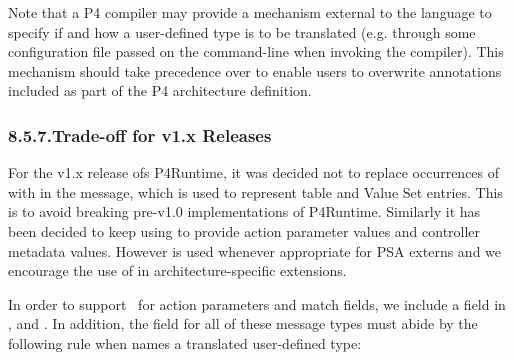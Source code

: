 \documentclass[11pt]{article}
\begin{document}
{%
\noindent{}Note that a P4 compiler may provide a mechanism external to the language to
specify if and how a user-defined type is to be translated (e.g. through some
configuration file passed on the command-line when invoking the compiler). This
mechanism should take precedence over  to enable users
to overwrite annotations included as part of the P4 architecture definition.%

\subsubsection{8.5.7.\hspace*{0.5em}Trade-off for v1.x Releases}\label{sec-trade-off-for-v1x-releases}%

\noindent{}For the v1.x release ofs P4Runtime, it was decided not to replace occurrences of
 with  in the  message, which is used to
represent table and Value Set entries. This is to avoid breaking pre-v1.0
implementations of P4Runtime. Similarly it has been decided to keep using
 to provide action parameter values and controller metadata
values. However  is used whenever appropriate for PSA externs and we
encourage the use of  in architecture-specific extensions.%

In order to support~ for action
parameters and match fields, we include a  field in
,  and
. In addition, the 
field for all of these message types must abide by the following rule when
 names a translated user-defined type:%

}
\end{document}
